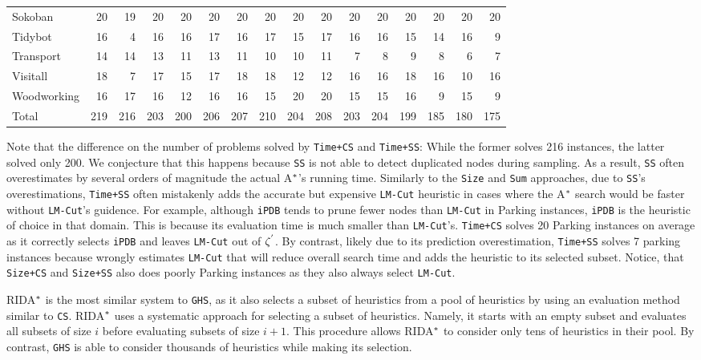 \begin{table}[htb]
\begin{tabular}{lrrrrrrrrrrrrrrr}
Sokoban&       20&     19&    20&   20&   20&  20&  20&   20&   20&  20&  20&   20&  20&  20&  20\\
Tidybot&       16&      4&    16&   16&   17&  16&  17&   15&   17&  16&  16&   15&  14&  16&   9\\
Transport&     14&     14&    13&   11&   13&  11&  10&   10&   11&   7&   8&    9&   8&   6&   7\\
Visitall&      18&      7&    17&   15&   17&  18&  18&   12&   12&  16&  16&   18&  16&  10&  16\\
Woodworking&   16&     17&    16&   12&   16&  16&  15&   20&   20&  15&  15&   16&   9&  15&   9\\ \hline
Total&        219&    216&   203&  200&  206& 207& 210&  204&  208& 203& 204&  199& 185& 180& 175\\ \hline
\end{tabular}
\label{tb_two}
\end{table}

Note that the difference on the number of problems solved by \texttt{Time+CS} and \texttt{Time+SS}: While the former solves 216 instances, the latter solved only 200. We conjecture that this happens because \texttt{SS} is not able to detect duplicated nodes during sampling. As a result, \texttt{SS} often overestimates by several orders of magnitude the actual A$\sp{*}$'s running time. Similarly to the \texttt{Size} and \texttt{Sum} approaches, due to \texttt{SS}'s overestimations, \texttt{Time+SS} often mistakenly adds the accurate but expensive \texttt{LM-Cut} heuristic in cases where the A$\sp{*}$ search would be faster without \texttt{LM-Cut}'s guidence. For example, although \texttt{iPDB} tends to prune fewer nodes than \texttt{LM-Cut} in Parking instances, \texttt{iPDB} is the heuristic of choice in that domain. This is because its evaluation time is much smaller than \texttt{LM-Cut}'s. \texttt{Time+CS} solves 20 Parking instances on average as it correctly selects \texttt{iPDB} and leaves \texttt{LM-Cut} out of $\zeta\sp{'}$. By contrast, likely due to its prediction overestimation, \texttt{Time+SS} solves 7 parking instances because wrongly estimates \texttt{LM-Cut} that will reduce overall search time and adds the heuristic to its selected subset. Notice, that \texttt{Size+CS} and \texttt{Size+SS} also does poorly Parking instances as they also always select \texttt{LM-Cut}.

RIDA$\sp{*}$ is the most similar system to \texttt{GHS}, as it also selects a subset of heuristics from a pool of heuristics by using an evaluation method similar to \texttt{CS}. RIDA$\sp{*}$ uses a systematic approach for selecting a subset of heuristics. Namely, it starts with an empty subset and evaluates all subsets of size $i$ before evaluating subsets of size $i+1$. This procedure allows RIDA$\sp{*}$ to consider only tens of heuristics in their pool. By contrast, \texttt{GHS} is able to consider thousands of heuristics while making its selection.

